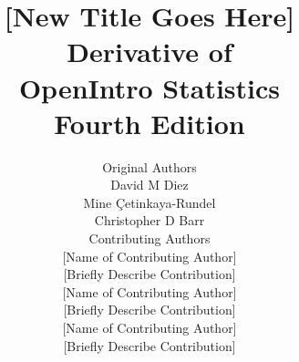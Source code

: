 

\title{\huge [New Title Goes Here] \\[2mm]
\large Derivative of \\
OpenIntro Statistics \\
Fourth Edition}
\author{\Large Original Authors \\[1.5mm]
\normalsize David M Diez \\
\normalsize Mine \c{C}etinkaya-Rundel \\[8mm]
\normalsize Christopher D Barr \\
\Large Contributing Authors \\[1.5mm]
\normalsize [Name of Contributing Author] \\
\small [Briefly Describe Contribution] \\[2mm]
\normalsize [Name of Contributing Author] \\
\small [Briefly Describe Contribution] \\[2mm]
\normalsize [Name of Contributing Author] \\
\small [Briefly Describe Contribution] \\[2mm]
}

